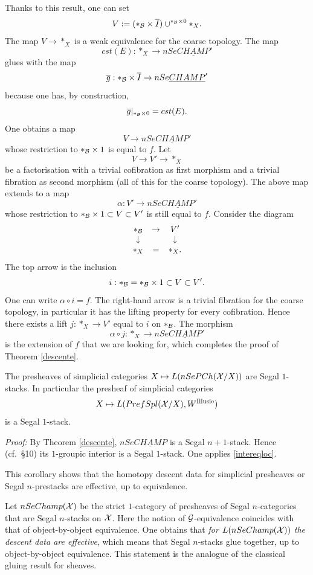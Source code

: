 Thanks to this result, one can set
$$
V:= (\ast _{{\cal B}}\times \overline{I}) \cup ^{\ast _{{\cal B}} \times 0}\ast _X.
$$
The map $V\rightarrow \ast _X$ is a weak equivalence for the
coarse topology. The map
$$
cst(E): \ast _X \rightarrow nSe\underline{CHAMP}'
$$
glues with the map
$$
\overline{g}: \ast _{{\cal B}} \times \overline{I} \rightarrow
nSe\underline{CHAMP}'
$$
because one has, by construction,
$$
\overline{g}|_{\ast _{{\cal B}} \times 0} = cst(E).
$$
One obtains a map
$$
V\rightarrow nSe\underline{CHAMP}'
$$
whose restriction to $\ast _{{\cal B}} \times 1$ is equal to $f$.
Let
$$
V\rightarrow V' \rightarrow \ast _X
$$
be a factorisation with a trivial cofibration as first morphism and
a trivial fibration as
second morphism (all of this for the coarse topology).
The above map extends to a map
$$
\alpha : V'\rightarrow nSe\underline{CHAMP}'
$$
whose restriction to
$\ast _{{\cal B}} \times 1\subset V \subset V'$ is still equal to $f$.
Consider the diagram
$$
\begin{array}{ccc}
\ast _{{\cal B}} & \rightarrow & V' \\
\downarrow && \downarrow \\
\ast _X & = & \ast _X.
\end{array}
$$
The top arrow is the inclusion
$$
i: \ast _{{\cal B}}=\ast _{{\cal B}} \times 1\subset V
\subset V'.
$$
One can write $\alpha \circ i = f$.
The right-hand arrow is a trivial fibration for the coarse topology,
in particular it has the lifting property for every
cofibration.
Hence there exists a lift $j:\ast _X\rightarrow V'$ equal to
$i$ on $\ast _{{\cal B}}$.   The morphism
$$
\alpha \circ j: \ast _X \rightarrow nSe\underline{CHAMP}'
$$
is the extension of $f$ that we are looking for, which completes the
proof
of Theorem \ref{descente}.
\eop



\begin{corollary}
The presheaves of simplicial categories $X\mapsto L(nSePCh({\cal X} /X))$
are Segal $1$-stacks. In particular the presheaf of simplicial
categories
$$
X\mapsto L(PrefSpl({\cal X} /X),W^{\rm Illusie})
$$
is a Segal $1$-stack.
\end{corollary}
{\em Proof:}
By Theorem \ref{descente}, $nSe\underline{CHAMP}$ is a Segal $n+1$-stack.
Hence (cf.\ \S10) its $1$-groupic interior is a Segal $1$-stack.
One applies \ref{intereqloc}.
\eop

This corollary shows that the homotopy descent data for simplicial
presheaves or Segal $n$-prestacks are effective, up to
equivalence.


Let $nSeChamp({\cal X} )$ be the strict $1$-category of presheaves of
Segal $n$-categories that are Segal $n$-stacks on ${\cal X}$.
Here the notion of ${\cal G}$-equivalence coincides with that of object-by-object
equivalence. One obtains that {\em for
$L(nSeChamp({\cal X} ))$ the descent data are effective}, which means
that Segal $n$-stacks glue together, up to object-by-object
equivalence. This statement is
the analogue of the classical gluing result for sheaves.

